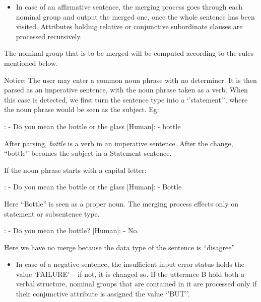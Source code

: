 \documentclass[twoside,a4paper,10pt]{report}
\newcommand{\dokutitlelevelone}[1]{} %
\newcommand{\dokuitalic}[1]{\textsl{#1}}
\newcommand{\dokuitem}{\item}
\begin{document}
\begin{itemize}
\dokuitem  In case of an affirmative sentence, the merging process goes through each nominal group and output the merged one, once the whole sentence has been visited. Attributes holding relative or conjunctive subordinate clauses are processed recursively.
\end{itemize}
The nominal group that is to be merged will be computed according to the rules mentioned below.

Notice: The user may enter a common noun phrase with no determiner. It is then parsed as an imperative sentence, with the noun phrase taken as a verb. When this case is detected, we first turn the sentence type into a ‘’statement’’, where the noun phrase would be seen as the subject.
Eg:


\small
\begin{verbatimtab}
  [Robot]: - Do you mean the bottle or the glass
  [Human]: - bottle
\end{verbatimtab}
\normalsize

After parsing, \dokuitalic{bottle} is a verb in an imperative sentence. After the change, “bottle” becomes the subject in a Statement sentence.

If the noun phrase starts with a capital letter:


\small
\begin{verbatimtab}
  [Robot]: - Do you mean the bottle or the glass
  [Human]: - Bottle
\end{verbatimtab}
\normalsize

Here “Bottle” is seen as a proper noun.
The merging process effects only on statement or subsentence type.



\small
\begin{verbatimtab}
  [Robot]: - Do you mean the bottle?
  [Human]: - No.
\end{verbatimtab}
\normalsize
Here we have no merge because the data type of the sentence is “disagree”


\begin{itemize}
\dokuitem  In case of a negative sentence, the insufficient input error status holds the value ‘FAILURE’ – if not, it is changed so. If the utterance B hold both a verbal structure, nominal groups that are contained in it are processed only if their conjunctive attribute is assigned the value ‘’BUT’’.
\end{itemize}

\dokutitlelevelone{Outputs of the Dialogs module}
\label{576053c82466d3c58479c2551469261a}%
\end{document}
